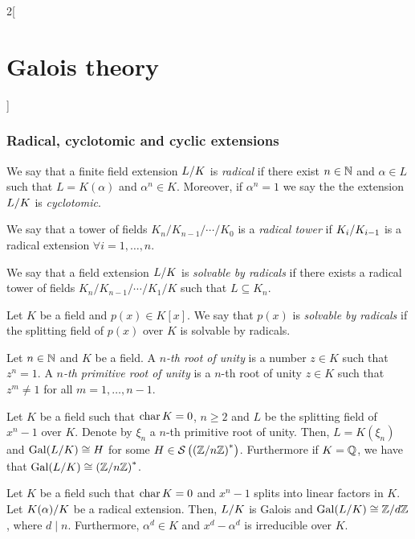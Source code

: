 \documentclass[../../../main.tex]{subfiles}
\begin{document}
\begin{multicols}{2}[\section{Galois theory}]
  \subsubsection{Radical, cyclotomic and cyclic extensions}
  \begin{definition}
    We say that a finite field extension $\quot{L}{K}$ is \emph{radical} if there exist $n\in\mathbb{N}$ and $\alpha\in L$ such that $L=K(\alpha)$ and $\alpha^n\in K$. Moreover, if $\alpha^n=1$ we say the the extension $\quot{L}{K}$ is \emph{cyclotomic}.
  \end{definition}
  \begin{definition}
    We say that a tower of fields $K_n/K_{n-1}/\cdots/K_0$ is a \emph{radical tower} if $\quot{K_i}{K_{i-1}}$ is a radical extension $\forall i=1,\ldots,n$.
  \end{definition}
  \begin{definition}
    We say that a field extension $\quot{L}{K}$ is \emph{solvable by radicals} if there exists a radical tower of fields $K_n/K_{n-1}/\cdots/K_1/K$ such that $L\subseteq K_n$.
  \end{definition}
  \begin{definition}
    Let $K$ be a field and $p(x)\in K[x]$. We say that $p(x)$ is \emph{solvable by radicals} if the splitting field of $p(x)$ over $K$ is solvable by radicals.
  \end{definition}
  \begin{definition}
    Let $n\in \mathbb{N}$ and $K$ be a field. A \emph{$n$-th root of unity} is a number $z\in K$ such that $z^n=1$. A \emph{$n$-th primitive root of unity} is a $n$-th root of unity $z\in K$ such that $z^m\ne 1$ for all $m=1,\ldots,n-1$.
  \end{definition}
  \begin{prop}
    Let $K$ be a field such that $\operatorname{char} K=0$, $n\geq 2$ and $L$ be the splitting field of $x^n-1$ over $K$. Denote by $\xi_n$ a $n$-th primitive root of unity. Then, $L=K(\xi_n)$ and $\Gal(\quot{L}{K})\cong H$ for some $H\in\mathcal{S}\left({(\quot{\ZZ}{n\ZZ})}^*\right)$. Furthermore if $K=\mathbb{Q}$, we have that $\Gal(\quot{L}{K})\cong {(\quot{\ZZ}{n\ZZ})}^*$.
  \end{prop}
  \begin{prop}
    Let $K$ be a field such that $\operatorname{char} K=0$ and $x^n-1$ splits into linear factors in $K$. Let $\quot{K(\alpha)}{K}$ be a radical extension. Then, $\quot{L}{K}$ is Galois and $\Gal(\quot{L}{K})\cong\quot{\ZZ}{d\ZZ}$, where $d\mid n$. Furthermore, $\alpha^d\in K$ and $x^d-\alpha^d$ is irreducible over $K$.

\end{prop}
\end{multicols}
\end{document}
